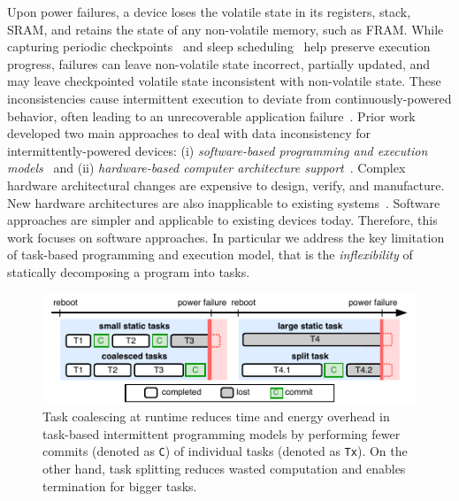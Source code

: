 Upon power failures, a device loses the volatile state in its registers, stack, SRAM, and retains the state of any non-volatile memory, such as FRAM. While capturing periodic checkpoints~\cite{mementos,quickrecall} and sleep scheduling~\cite{dewdrop,hibernus,hibernusplusplus} help preserve execution progress, failures can leave non-volatile state incorrect, partially updated, and may leave checkpointed volatile state inconsistent with non-volatile state. These inconsistencies cause intermittent execution to deviate from continuously-powered behavior, often leading to an unrecoverable application failure~\cite{dino,edb}. Prior work developed two main approaches to deal with data inconsistency for intermittently-powered devices: (i) \emph{software-based programming and execution models}~\cite{dino,ratchet,chain,alpaca} and (ii) \emph{hardware-based computer architecture support}~\cite{hicks_isca_2017,idetic,nvp}. Complex hardware architectural changes are expensive to design, verify, and manufacture. New hardware architectures are also inapplicable to existing systems~\cite{hicks_isca_2017,nvp}. Software approaches are simpler and applicable to existing devices today. Therefore, this work focuses on software approaches. In particular we address the key limitation of task-based programming and execution model, that is the {\em inflexibility} of statically decomposing a program into tasks.
%
\begin{figure}
    \centering
    \includegraphics[width=\columnwidth]{figures/intro-figure-horiz.pdf}
    \caption{Task coalescing at runtime reduces time and energy overhead in task-based intermittent programming models by performing fewer commits (denoted as \texttt{C}) of individual tasks (denoted as \texttt{Tx}). On the other hand, task splitting reduces wasted computation and enables termination for bigger tasks.}
    \label{fig:coalesce}
\end{figure}



